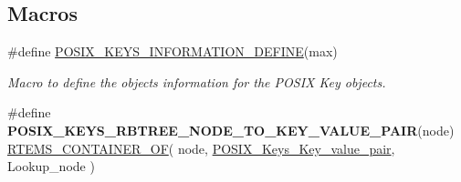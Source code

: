 \subsection*{Macros}
\begin{DoxyCompactItemize}
\item 
\#define \mbox{\hyperlink{group__POSIX__KEY_ga9a113b4c4e7f196f0f46f581c43332e0}{P\+O\+S\+I\+X\+\_\+\+K\+E\+Y\+S\+\_\+\+I\+N\+F\+O\+R\+M\+A\+T\+I\+O\+N\+\_\+\+D\+E\+F\+I\+NE}}(max)
\begin{DoxyCompactList}\small\item\em Macro to define the objects information for the P\+O\+S\+IX Key objects. \end{DoxyCompactList}\item 
\mbox{\label{group__POSIX__KEY_ga13e45762d0f74120e334bf1d18fc0f10}} 
\#define {\bfseries P\+O\+S\+I\+X\+\_\+\+K\+E\+Y\+S\+\_\+\+R\+B\+T\+R\+E\+E\+\_\+\+N\+O\+D\+E\+\_\+\+T\+O\+\_\+\+K\+E\+Y\+\_\+\+V\+A\+L\+U\+E\+\_\+\+P\+A\+IR}(node)~\mbox{\hyperlink{group__RTEMSScoreBaseDefs_gab2e7a0141fd898ae358fa9b134aa2610}{R\+T\+E\+M\+S\+\_\+\+C\+O\+N\+T\+A\+I\+N\+E\+R\+\_\+\+OF}}( node, \mbox{\hyperlink{structPOSIX__Keys__Key__value__pair}{P\+O\+S\+I\+X\+\_\+\+Keys\+\_\+\+Key\+\_\+value\+\_\+pair}}, Lookup\+\_\+node )
\end{DoxyCompactItemize}
